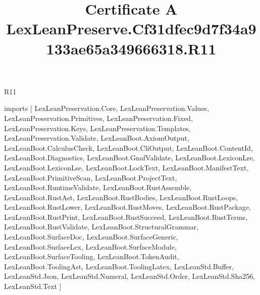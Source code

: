 \begin{lexlean}{R11}
\title{Certificate A LexLeanPreserve.Cf31dfec9d7f34a9133ae65a349666318.R11}
\begin{coremodule}
imports [
  LexLeanPreservation.Core,
  LexLeanPreservation.Values,
  LexLeanPreservation.Primitives,
  LexLeanPreservation.Fixed,
  LexLeanPreservation.Keys,
  LexLeanPreservation.Templates,
  LexLeanPreservation.Validate,
  LexLeanBoot.AxiomOutput,
  LexLeanBoot.CalculusCheck,
  LexLeanBoot.CliOutput,
  LexLeanBoot.ContentId,
  LexLeanBoot.Diagnostics,
  LexLeanBoot.GnafValidate,
  LexLeanBoot.LexiconLre,
  LexLeanBoot.LexiconLse,
  LexLeanBoot.LockText,
  LexLeanBoot.ManifestText,
  LexLeanBoot.PrimitiveScan,
  LexLeanBoot.ProjectText,
  LexLeanBoot.RuntimeValidate,
  LexLeanBoot.RustAssemble,
  LexLeanBoot.RustAst,
  LexLeanBoot.RustBodies,
  LexLeanBoot.RustLoops,
  LexLeanBoot.RustLower,
  LexLeanBoot.RustMoves,
  LexLeanBoot.RustPackage,
  LexLeanBoot.RustPrint,
  LexLeanBoot.RustSucceed,
  LexLeanBoot.RustTerms,
  LexLeanBoot.RustValidate,
  LexLeanBoot.StructuralGrammar,
  LexLeanBoot.SurfaceDoc,
  LexLeanBoot.SurfaceGeneric,
  LexLeanBoot.SurfaceLex,
  LexLeanBoot.SurfaceModule,
  LexLeanBoot.SurfaceTooling,
  LexLeanBoot.TokenAudit,
  LexLeanBoot.ToolingAst,
  LexLeanBoot.ToolingLatex,
  LexLeanStd.Buffer,
  LexLeanStd.Json,
  LexLeanStd.Numeral,
  LexLeanStd.Order,
  LexLeanStd.Sha256,
  LexLeanStd.Text
]


\end{coremodule}
\end{lexlean}
